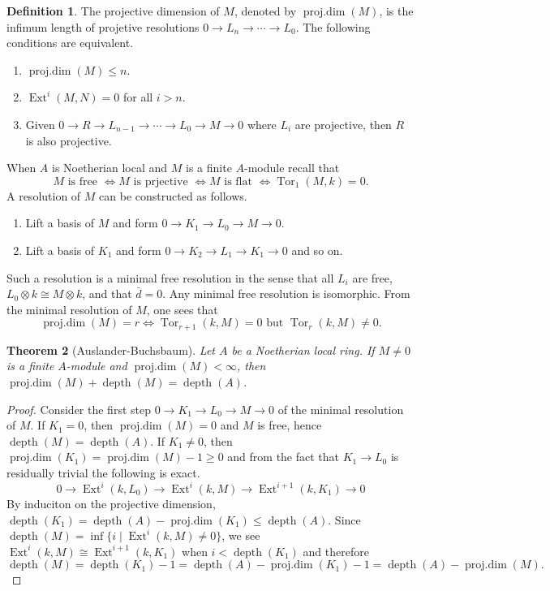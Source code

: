 \documentclass[leqno]{amsart}
\DeclareMathOperator{\depth}{depth}
\DeclareMathOperator{\prd}{proj.dim}
\newcommand{\1}{\mathbf{1}}
\DeclareMathOperator{\Ext}{Ext}
\DeclareMathOperator{\Tor}{Tor}
\newtheorem{thm}{Theorem}[section]
\theoremstyle{definition}
\newtheorem{defn}[thm]{Definition}
\theoremstyle{remark}
\begin{document}
\begin{defn}
	The projective dimension of $M$,
	denoted by $\prd(M)$, is the 
	infimum length of projetive resolutions 
	$0\to L_{n}\to \cdots\to L_0$.
	The following conditions are equivalent.
	\begin{enumerate}[label=(\alph*)]
		\item $\prd(M)\leq n$.
		\item  $\Ext^i(M,N)=0$ for all $i>n$.
		\item Given  $0\to R\to L_{n-1}\to \cdots\to L_0
			\to M\to 0$ where $L_i$ are projective,
			then  $R$ is also projective.
	\end{enumerate}
\end{defn}
When $A$ is Noetherian local and  $M$ is a finite  $A$-module
recall that 
\[
	M  \text{ is free } \Longleftrightarrow
	M  \text{ is prjective } \Longleftrightarrow
	M  \text{ is flat } \Longleftrightarrow
	\Tor_1(M,k)=0.
\]
A resolution of $M$ can be constructed as follows.
\begin{enumerate}
	\item Lift a basis of $M$ and form
		 $0\to K_1\to L_0\to M\to 0$.
	\item Lift a basis of  $K_1$ and form
		  $0\to K_2\to L_1\to K_1\to 0$ and so on.
\end{enumerate}
Such a resolution is a minimal free resolution in the sense that
all $L_i$ are free,  $L_0\otimes k\cong M\otimes k$,
and that  $\bar{d}=0$.
Any minimal free resolution is isomorphic.
From the minimal resolution of $M$, one sees that 
\[
	\prd(M)=r \Longleftrightarrow
	\Tor_{r+1}(k,M)=0 \text{ but }
	\Tor_{r}(k,M)\neq0.
\]


\begin{thm}[Auslander-Buchsbaum]
	Let $A$ be a Noetherian local ring.
	If  $M\neq 0$ is a finite  $A$-module 
	and $\prd(M)<\infty$, then
	$\prd(M)+\depth(M)=\depth(A)$.
\end{thm}
\begin{proof}
	Consider the first step 
	$0\to K_1\to L_0\to M\to 0$
	of the minimal resolution of $M$.
	If $K_1=0$, then $\prd(M)=0$ and $M$ is free,
	hence $\depth(M)=\depth(A)$.
	If $K_1\neq 0$, then $\prd(K_1)=\prd(M)-1\geq 0$ and
	from the fact that $K_1\to L_0$ is residually trivial
	the following is exact.
	\[
		0\to \Ext^i(k,L_0)\to 
		\Ext^i(k,M)\to 
		\Ext^{i+1}(k,K_1)\to 0 
	\]
	By induciton on the projective dimension,
	$\depth(K_1)=\depth(A)-\prd(K_1)\leq \depth(A)$.
	Since $\depth(M)=\inf\{i\mid \Ext^i(k,M)\neq 0\}$,
	we see $\Ext^i(k,M)\cong \Ext^{i+1}(k,K_1)$ 
	when $i<\depth(K_1)$ and therefore
	\[
		\depth(M)=\depth(K_1)-1=\depth(A)-\prd(K_1)-1
		=\depth(A)-\prd(M).
	\]
\end{proof}
\end{document}
